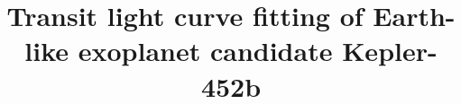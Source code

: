 \documentclass[modern]{aastex631}
\begin{document}
\title{Transit light curve fitting of Earth-like exoplanet candidate Kepler-452b}


\end{document}
